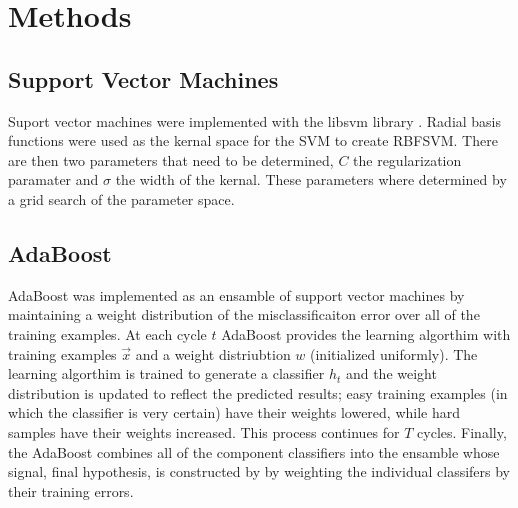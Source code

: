 \section{Methods}
\label{sec:Methods}

\subsection{Support Vector Machines}

Suport vector machines were implemented with the libsvm library \cite{li_adaboost_2008}.
Radial basis functions were used as the kernal space for the SVM to create RBFSVM.
There are then two parameters that need to be determined, $C$ the regularization paramater and $\sigma$ the width of the kernal.
These parameters where determined by a grid search of the parameter space.

\subsection{AdaBoost}

AdaBoost was implemented as an ensamble of support vector machines by maintaining a weight distribution of the misclassificaiton error over all of the training examples.
At each cycle $t$ AdaBoost provides the learning algorthim with training examples $\vec{x}$ and a weight distriubtion $w$ (initialized uniformly).
The learning algorthim is trained to generate a classifier $h_t$ and the weight distribution is updated to reflect the predicted results; easy training examples (in which the classifier is very certain) have their weights lowered, while hard samples have their weights increased.
This process continues for $T$ cycles.
Finally, the AdaBoost combines all of the component classifiers into the ensamble whose signal, final hypothesis, is constructed by by weighting the individual classifers by their training errors.

